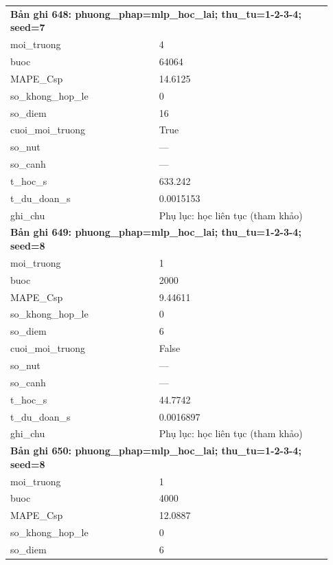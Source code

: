 \begin{longtable}{p{0.43\linewidth}p{0.50\linewidth}}
\midrule
\multicolumn{2}{p{0.95\linewidth}}{\textbf{Bản ghi 648: phuong\_phap=mlp\_hoc\_lai; thu\_tu=1-2-3-4; seed=7}} \\
moi\_\allowbreak truong & 4 \\
buoc & 64064 \\
MAPE\_\allowbreak Csp & 14.6125 \\
so\_\allowbreak khong\_\allowbreak hop\_\allowbreak le & 0 \\
so\_\allowbreak diem & 16 \\
cuoi\_\allowbreak moi\_\allowbreak truong & True \\
so\_\allowbreak nut & — \\
so\_\allowbreak canh & — \\
t\_\allowbreak hoc\_\allowbreak s & 633.242 \\
t\_\allowbreak du\_\allowbreak doan\_\allowbreak s & 0.0015153 \\
ghi\_\allowbreak chu & Phụ lục: học liên tục (tham khảo) \\
\midrule
\multicolumn{2}{p{0.95\linewidth}}{\textbf{Bản ghi 649: phuong\_phap=mlp\_hoc\_lai; thu\_tu=1-2-3-4; seed=8}} \\
moi\_\allowbreak truong & 1 \\
buoc & 2000 \\
MAPE\_\allowbreak Csp & 9.44611 \\
so\_\allowbreak khong\_\allowbreak hop\_\allowbreak le & 0 \\
so\_\allowbreak diem & 6 \\
cuoi\_\allowbreak moi\_\allowbreak truong & False \\
so\_\allowbreak nut & — \\
so\_\allowbreak canh & — \\
t\_\allowbreak hoc\_\allowbreak s & 44.7742 \\
t\_\allowbreak du\_\allowbreak doan\_\allowbreak s & 0.0016897 \\
ghi\_\allowbreak chu & Phụ lục: học liên tục (tham khảo) \\
\midrule
\multicolumn{2}{p{0.95\linewidth}}{\textbf{Bản ghi 650: phuong\_phap=mlp\_hoc\_lai; thu\_tu=1-2-3-4; seed=8}} \\
moi\_\allowbreak truong & 1 \\
buoc & 4000 \\
MAPE\_\allowbreak Csp & 12.0887 \\
so\_\allowbreak khong\_\allowbreak hop\_\allowbreak le & 0 \\
so\_\allowbreak diem & 6 \\

\end{longtable}
